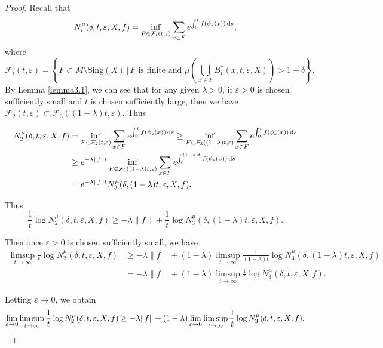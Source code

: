 \documentclass[10pt]{article}
\newtheorem*{Theorem A}{Theorem A}
\begin{document}
\begin{proof}
Recall that \[
N_i^\mu(\delta, t, \varepsilon, X, f) = \inf_{\substack{F \in \mathcal{F}_i(t, \varepsilon) }} \sum_{x \in F} e^{\int_0^t f(\phi_s(x)) \, {\rm d}s},
\]
where
\[
\mathcal{F}_i(t, \varepsilon) = \left\{ F \subset M \setminus \text{Sing}(X) \,\big|\, F \text{ is finite and }\mu\left( \bigcup_{x \in F} B_i^*(x, t, \varepsilon, X) \right) > 1 - \delta \right\}.
\]
By Lemma \ref{lemma3.1}, we can see that for any given $\lambda > 0$, if $\varepsilon>0$ is chosen sufficiently small and $t$ is chosen sufficiently large, then we have $\mathcal{F}_2(t, \varepsilon)\subset \mathcal{F}_3((1 - \lambda)t, \varepsilon)$. Thus

\begin{align*}
    N_2^\mu(\delta, t, \varepsilon, X, f) &= \inf_{F \in \mathcal{F}_2(t, \varepsilon)} \sum_{x \in F} e^{\int_0^t f(\phi_s(x)) \, {\rm d}s}\geq \inf_{F \in \mathcal{F}_3((1 - \lambda)t, \varepsilon)} \sum_{x \in F} e^{\int_0^{t} f(\phi_s(x)) \, {\rm d}s} \\
    &\geq e^{-\lambda \|f\| t} \inf_{F \in \mathcal{F}_3((1 - \lambda)t, \varepsilon)}\sum_{x \in F} e^{\int_0^{(1 - \lambda)t} f(\phi_s(x)) \, {\rm d}s}\\
    &=e^{-\lambda \|f\| t}N_3^\mu(\delta, (1 - \lambda)t, \varepsilon, X, f).
\end{align*}

\noindent
Thus
\[
\frac{1}{t} \log N_2^\mu(\delta, t, \varepsilon, X, f) \geq -\lambda \|f\| + \frac{1}{t} \log N_3^\mu(\delta, (1 - \lambda)t, \varepsilon, X, f).
\]

\noindent
Then once $\varepsilon > 0$ is chosen sufficiently small, we have
\begin{align*}
\limsup_{t \to \infty} \frac{1}{t} \log N_2^\mu(\delta, t, \varepsilon, X, f)&
\geq -\lambda \|f\| +(1-\lambda) \limsup_{t \to \infty} \frac{1}{(1 - \lambda)t} \log N_3^\mu(\delta, (1 - \lambda)t, \varepsilon, X, f)\\
&=-\lambda \|f\| +(1-\lambda)\limsup_{t \to \infty} \frac{1}{t} \log N_3^\mu(\delta, t, \varepsilon, X, f).
\end{align*}

\noindent
Letting $\varepsilon \to 0$, we obtain
\[
\lim_{\varepsilon \to 0} \limsup_{t \to \infty} \frac{1}{t} \log N_2^\mu(\delta, t, \varepsilon, X, f) \\
\geq-\lambda \|f\|+
(1-\lambda)\lim_{\varepsilon \to 0} \limsup_{t \to \infty} \frac{1}{t} \log N_3^\mu(\delta,t, \varepsilon, X, f).
\]


\end{proof}
\end{document}
